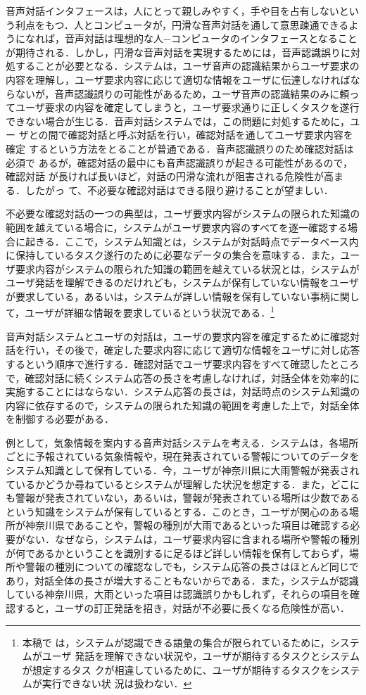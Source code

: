 音声対話インタフェースは，人にとって親しみやすく，手や目を占有しないとい
う利点をもつ．人とコンピュータが，円滑な音声対話を通して意思疎通できるよ
うになれば，音声対話は理想的な人−コンピュータのインタフェースとなること
が期待される．しかし，円滑な音声対話を実現するためには，音声認識誤りに対
処することが必要となる．システムは，ユーザ音声の認識結果からユーザ要求の
内容を理解し，ユーザ要求内容に応じて適切な情報をユーザに伝達しなければな
らないが，音声認識誤りの可能性があるため，ユーザ音声の認識結果のみに頼っ
てユーザ要求の内容を確定してしまうと，ユーザ要求通りに正しくタスクを遂行
できない場合が生じる．音声対話システムでは，この問題に対処するために，ユー
ザとの間で確認対話と呼ぶ対話を行い，確認対話を通してユーザ要求内容を確定
するという方法をとることが普通である．音声認識誤りのため確認対話は必須で
あるが，確認対話の最中にも音声認識誤りが起きる可能性があるので，確認対話
が長ければ長いほど，対話の円滑な流れが阻害される危険性が高まる．したがっ
て、不必要な確認対話はできる限り避けることが望ましい．

不必要な確認対話の一つの典型は，ユーザ要求内容がシステムの限られた知識の
範囲を越えている場合に，システムがユーザ要求内容のすべてを逐一確認する場
合に起きる．ここで，システム知識とは，システムが対話時点でデータベース内
に保持しているタスク遂行のために必要なデータの集合を意味する．また，ユー
ザ要求内容がシステムの限られた知識の範囲を越えている状況とは，システムが
ユーザ発話を理解できるのだけれども，システムが保有していない情報をユーザ
が要求している，あるいは，システムが詳しい情報を保有していない事柄に関し
て，ユーザが詳細な情報を要求しているという状況である．\footnote {本稿で
は，システムが認識できる語彙の集合が限られているために，システムがユーザ
発話を理解できない状況や，ユーザが期待するタスクとシステムが想定するタス
クが相違しているために、ユーザが期待するタスクをシステムが実行できない状
況は扱わない．}

音声対話システムとユーザの対話は，ユーザの要求内容を確定するために確認対
話を行い，その後で，確定した要求内容に応じて適切な情報をユーザに対し応答
するという順序で進行する．確認対話でユーザ要求内容をすべて確認したところ
で，確認対話に続くシステム応答の長さを考慮しなければ，対話全体を効率的に
実施することにはならない．システム応答の長さは，対話時点のシステム知識の
内容に依存するので，システムの限られた知識の範囲を考慮した上で，対話全体
を制御する必要がある．

例として，気象情報を案内する音声対話システムを考える．システムは，各場所
ごとに予報されている気象情報や，現在発表されている警報についてのデータを
システム知識として保有している．今，ユーザが神奈川県に大雨警報が発表され
ているかどうか尋ねているとシステムが理解した状況を想定する．また，どこに
も警報が発表されていない，あるいは，警報が発表されている場所は少数である
という知識をシステムが保有しているとする．このとき，ユーザが関心のある場
所が神奈川県であることや，警報の種別が大雨であるといった項目は確認する必
要がない．なぜなら，システムは，ユーザ要求内容に含まれる場所や警報の種別
が何であるかということを識別するに足るほど詳しい情報を保有しておらず，場
所や警報の種別についての確認なしでも，システム応答の長さはほとんど同じで
あり，対話全体の長さが増大することもないからである．また，システムが認識
している神奈川県，大雨といった項目は認識誤りかもしれず，それらの項目を確
認すると，ユーザの訂正発話を招き，対話が不必要に長くなる危険性が高い．

